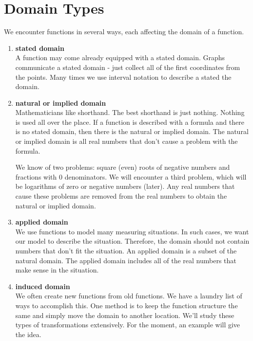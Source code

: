 \documentclass{ximera}
\begin{document}
\section{Domain Types}

We encounter functions in several ways, each affecting the domain of a function.

\begin{enumerate}
\item  \textbf{\textcolor{green!50!black}{stated domain}}   \\
A function may come already equipped with a stated domain.  Graphs communicate a stated domain - just collect all of the first coordinates from the points. Many times we use interval notation to describe a stated the domain.


\item  \textbf{\textcolor{green!50!black}{natural or implied domain}}   \\
Mathematicians like shorthand. The best shorthand is just nothing.  Nothing is used all over the place. If a function is described with a formula and there is no stated domain, then there is the natural or implied domain.  The natural or implied domain is all real numbers that don't cause a problem with the formula.

We know of two problems: square (even) roots of negative numbers and fractions with $0$ denominators.  We will encounter a third problem, which will be logarithms of zero or negative numbers (later). Any real numbers that cause these problems are removed from the real numbers to obtain the natural or implied domain.


\item  \textbf{\textcolor{green!50!black}{applied domain}}   \\
We use functions to model many measuring situations. In such cases, we want our model to describe the situation.  Therefore, the domain should not contain numbers that don't fit the situation. An applied domain is a subset of the natural domain.  The applied domain includes all of the real numbers that make sense in the situation.


\item \textbf{\textcolor{green!50!black}{induced domain}}  \\
We often create new functions from old functions. We have a laundry list of ways to accomplish this.  One method is to keep the function structure the same and simply move the domain to another location. We'll study these types of transformations extensively. For the moment, an example will give the idea. \\








\end{enumerate}
\end{document}
